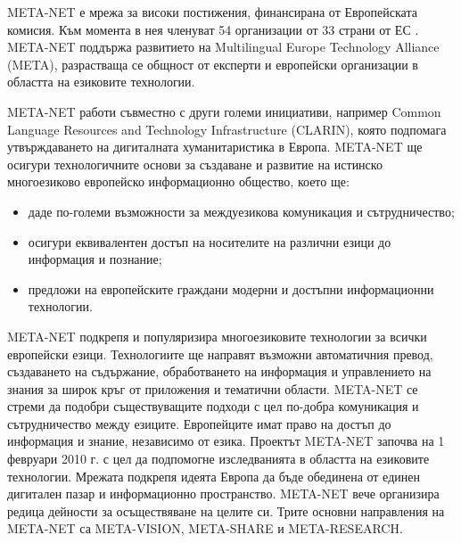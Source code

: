 \documentclass[]{../../metanetpaper}
\begin{document}
\begin{multicols}{2}

  META-NET е мрежа за високи постижения, финансирана от Европейската
  комисия. Към момента в нея членуват 54 организации от 33 страни от
  ЕС \cite{rehm2011}. META-NET поддържа развитието
  на Multilingual Europe Technology Alliance
  (META), разрастваща се общност от експерти и
  европейски организации в областта на езиковите
  технологии.

META-NET работи съвместно с други големи инициативи, например Common Language Resources and Technology Infrastructure (CLARIN), която подпомага утвърждаването на дигиталната хуманитаристика в Европа. META-NET ще осигури  технологичните основи за създаване и развитие на истинско многоезиково европейско информационно общество, което ще:

\begin{itemize}
\item даде по-големи възможности за междуезикова комуникация и сътрудничество;
\item осигури еквивалентен достъп на носителите на различни езици до информация и познание;
\item предложи на европейските граждани модерни и достъпни информационни
 технологии.
\end{itemize}

META-NET подкрепя и популяризира многоезиковите технологии за всички
европейски езици. Технологиите ще направят възможни автоматичния
превод, създаването на съдържание, обработването на информация и
управлението на знания за широк кръг от приложения и тематични
области. META-NET се стреми да подобри съществуващите подходи с цел
по-добра комуникация и сътрудничество между езиците.  Европейците
имат право на достъп до информация и знание, независимо от езика.
%
Проектът META-NET започва на 1 февруари 2010 г. с цел да подпомогне
изследванията в областта на езиковите технологии. Мрежата подкрепя
идеята Европа да бъде обединена от единен дигитален пазар и
информационно пространство. META-NET вече организира редица дейности
за осъществяване на целите си. Трите основни направления на META-NET
са META-VISION, META-SHARE и META-RESEARCH.


\end{multicols}
\end{document}

